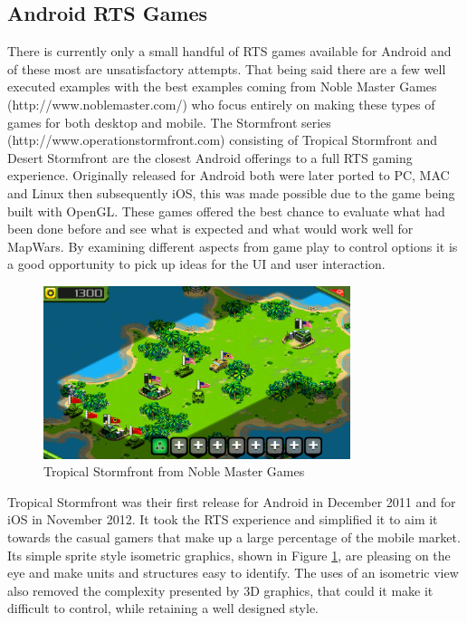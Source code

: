 \subsection{Android RTS Games}
There is currently only a small handful of RTS games available for Android and of these most are unsatisfactory attempts. That being said there are a few well executed examples with the best examples coming from Noble Master Games (http://www.noblemaster.com/) who focus entirely on making these types of games for both desktop and mobile. The Stormfront series (http://www.operationstormfront.com) consisting of Tropical Stormfront and Desert Stormfront are the closest Android offerings to a full RTS gaming experience. Originally released for Android both were later ported to PC, MAC and Linux then subsequently iOS, this was made possible due to the game being built with OpenGL. These games offered the best chance to evaluate what had been done before and see what is expected and what would work well for MapWars. By examining different aspects from game play to control options it is a good opportunity to pick up ideas for the UI and user interaction.

\begin{figure}
  \centering
   \includegraphics[width=0.8\textwidth]{Images/tropical_storm.png}
  \caption{Tropical Stormfront from Noble Master Games}
  \label{fig:ts}
\end{figure}

Tropical Stormfront was their first release for Android in December 2011 and for iOS in November 2012. It took the RTS experience and simplified it to aim it towards the casual gamers that make up a large percentage of the mobile market. Its simple sprite style isometric graphics, shown in Figure \ref{fig:ts}, are pleasing on the eye and make units and structures easy to identify. The uses of an isometric view also removed the complexity presented by 3D graphics, that could it make it difficult to control, while retaining a well designed style.

